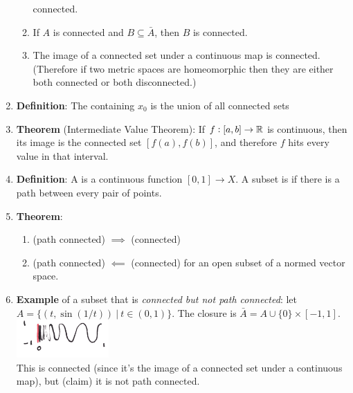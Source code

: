 \begin{enumerate}
\begin{enumerate}[label=(\roman*)]
    connected.
  \item If $A$ is connected and $B \subseteq \bar A$, then $B$ is connected.
  \item The image of a connected set under a continuous map is connected. (Therefore if two metric
    spaces are homeomorphic then they are either both connected or both disconnected.)
  \end{enumerate}
\item {\bf Definition}: The  containing $x_0$ is the union of all connected sets
\item {\bf Theorem} (Intermediate Value Theorem): If $f: [a, b] \to \mathbb{R}$ is continuous, then its
  image is the connected set $[f(a), f(b)]$, and therefore $f$ hits every value in that interval.
\item {\bf Definition}: A  is a continuous function $[0, 1] \to X$. A subset is
   if there is a path between every pair of points.
\item {\bf Theorem}:
  \begin{enumerate}[label=(\roman*)]
  \item (path connected) $\implies$ (connected)
  \item (path connected) $\impliedby$ (connected) for an open subset of a normed vector space.
  \end{enumerate}
\item {\bf Example} of a subset that is {\it connected but not path connected}: let
  $A = \{(t, \sin(1/t))~|~t \in (0, 1)\}$. The closure is $\bar A = A \cup \{0\} \times [-1,
  1]$.\\
  \includegraphics[width=100pt]{img/oxford-a2-connected-not-path-connected.png}\\
  This is connected (since it's the image of a connected set under a continuous map), but
  (claim) it is not path connected.


\end{enumerate}
